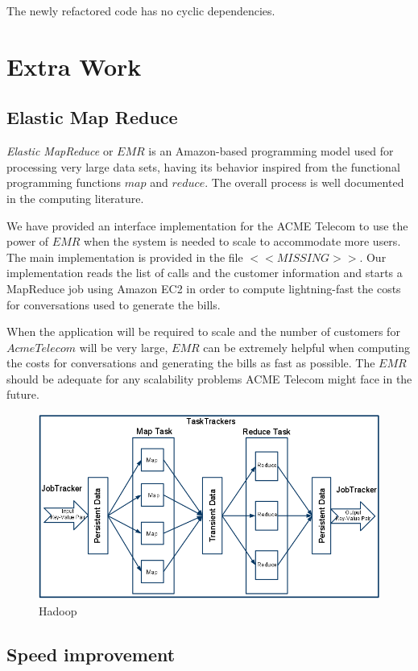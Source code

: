 \documentclass[11pt,twocolumn]{article} %
\begin{document}
The newly refactored code has no cyclic dependencies.

\section{Extra Work}
\subsection{Elastic Map Reduce}
\emph{Elastic MapReduce} or $EMR$ is an Amazon-based programming model used for processing very large data sets, 
having its behavior inspired from the functional programming functions $map$ and $reduce$. The overall process is well
documented in the computing literature.

We have provided an interface implementation for the ACME Telecom to use the power of $EMR$ when the system is needed to scale to 
accommodate more users. The main implementation is provided in the file $<<MISSING>>$. Our implementation reads the list of calls and the 
customer information and starts a MapReduce job using Amazon EC2 in order to compute lightning-fast the costs for conversations used 
to generate the bills.

When the application will be required to scale and the number of customers for $AcmeTelecom$ will be very large, $EMR$ can be extremely 
helpful when computing the costs for conversations and generating the bills as fast as possible. The $EMR$ should be adequate for any 
scalability problems ACME Telecom might face in the future.
\begin{figure}[ht]
\includegraphics[scale=0.25]{hadoop.png}
\caption{Hadoop \cite{hadoop}}
\end{figure}

\subsection{Speed improvement}
\end{document}
